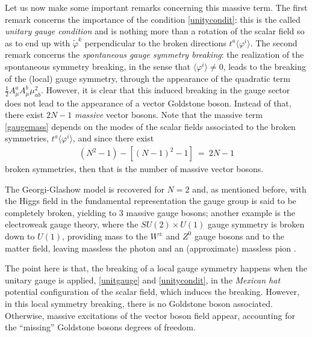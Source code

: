 \begin{itemize}
Let us now make some important remarks concerning this massive term. The first remark concerns
the importance of the condition \eqref{unitycondit}: this is the called \emph{unitary gauge
condition} and is nothing more than a rotation of the scalar field so as to end up with
$\tilde{\varphi}^{k}$ perpendicular to the broken directions $t^{a}\langle \varphi^{i}
\rangle$. The second remark concerns the \emph{spontaneous gauge symmetry breaking}: the
realization of the spontaneous symmetry breaking, in the sense that $\langle \varphi^{i}
\rangle \neq 0$, leads to the breaking of the (local) gauge symmetry, through the appearance of
the quadratic term $\frac{1}{2}A^{a}_{\mu}A^{b}_{\mu}\mu^{2}_{ab}$. However, it is clear that
this induced breaking in the gauge sector does not lead to the appearance of a vector Goldstone
boson. Instead of that, there exist $2N-1$ \emph{massive} vector bosons. Note that the massive
term \eqref{gaugemass} depends on the modes of the scalar fields associated to the broken
symmetries, $t^{a}\langle \varphi^{i} \rangle$, and since there exist  
\begin{eqnarray}
(N^{2}-1) - [(N-1)^{2} -1] ~=~ 2N -1 
\end{eqnarray} 
broken symmetries, then that is the number of massive vector bosons.

The Georgi-Glashow model is recovered for $N=2$ and, as mentioned before, with the Higgs field
in the fundamental representation the gauge group is said to be completely broken, yielding to
$3$ massive gauge bosons; another example is the electroweak gauge theory, where the
$SU(2)\times U(1)$ gauge symmetry is broken down to $U(1)$, providing mass to the $W^{\pm}$ and
$Z^{0}$ gauge bosons and to the matter field, leaving massless the photon and an (approximate)
massless pion \cite{Weinberg:1996kr,Peskin:1995ev,Ryder:1985wq,Greensite:2011zz}.

The point here is that, the breaking of a local gauge symmetry happens when the unitary gauge
is applied, \eqref{unitgauge} and \eqref{unitycondit}, in the \emph{Mexican hat} potential
configuration of the scalar field, which induces the breaking. However, in this local symmetry
breaking, there is no Goldstone boson associated. Otherwise, massive excitations of the vector
boson field appear, accounting for the ``missing'' Goldstone bosons degrees of freedom.
\end{itemize}


